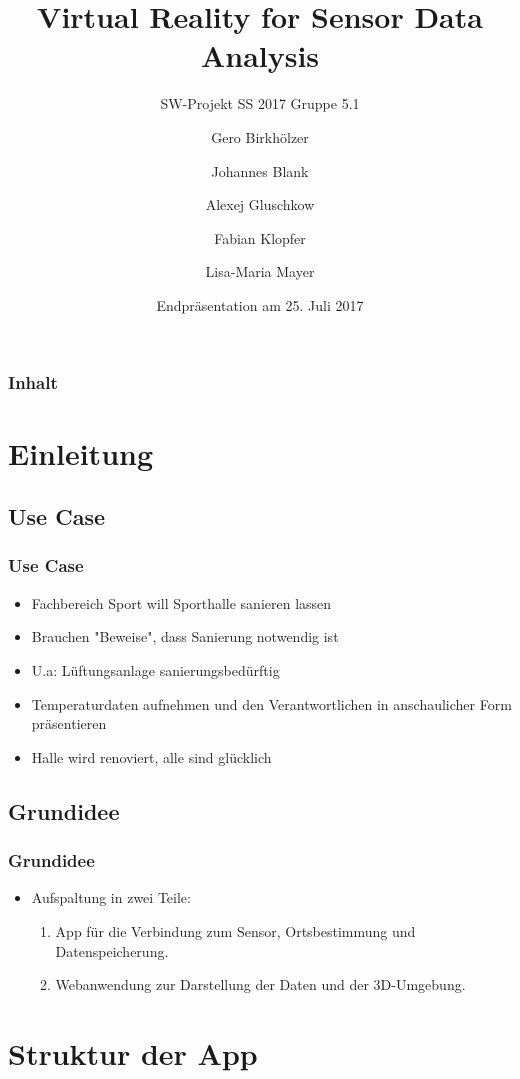 \documentclass{beamer}
\title{Virtual Reality for Sensor Data Analysis}
\subtitle{SW-Projekt SS 2017 Gruppe 5.1}
\author{Gero Birkhölzer \and Johannes Blank \and Alexej Gluschkow \\ \and Fabian Klopfer \and Lisa-Maria Mayer}
\date{Endpräsentation am 25. Juli 2017}
\begin{document}
\frame{\titlepage}



\begin{frame}
  \frametitle{Inhalt}
  \tableofcontents%
\end{frame}


\section{Einleitung}

\subsection{Use Case}

\begin{frame}
\frametitle{Use Case}
\begin{itemize}
	\item  Fachbereich Sport will Sporthalle sanieren lassen
	\item Brauchen "Beweise", dass Sanierung notwendig ist
	\item U.a: Lüftungsanlage sanierungsbedürftig
	\item Temperaturdaten aufnehmen und den Verantwortlichen in anschaulicher Form präsentieren
	\item Halle wird renoviert, alle sind glücklich
\end{itemize}
\end{frame}


\subsection{Grundidee} %

\begin{frame}
\frametitle{Grundidee}
\begin{itemize}
	\item Aufspaltung in zwei Teile: \pause
  \begin{enumerate}
    \item App für die Verbindung zum Sensor, Ortsbestimmung und Datenspeicherung.
    \item Webanwendung zur Darstellung der Daten und der 3D-Umgebung.
  \end{enumerate}
\end{itemize}
\end{frame}


\section{Struktur der App}
\end{document}
